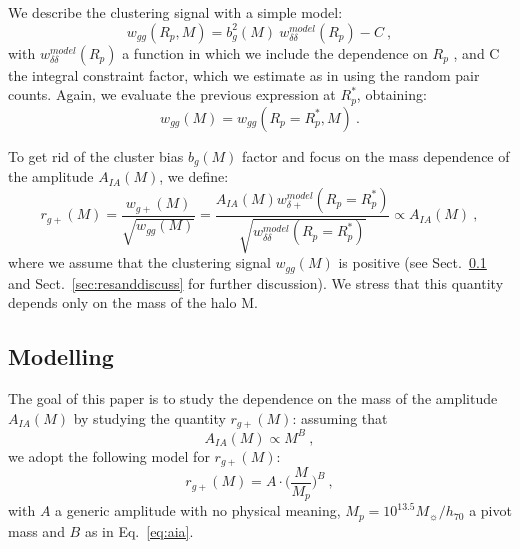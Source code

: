 \documentclass[a4paper,fleqn,usenatbib]{mnras}
\begin{document}
We describe the clustering signal with a simple model:
\begin{equation}
    w_{gg} (R_p, M)=b_g^2 (M)\ w_{\delta \delta}^{model} (R_p) - C \ , 
	\label{eq:wgg}
\end{equation}
with $w_{\delta \delta}^{model} (R_p)$ a function in which we include the dependence on $R_p$ \citep[equation 9]{vanUitertJoachimi2017}, and C the integral constraint factor, which we estimate as in \citet[equation 8]{RocheEales1999} using the random pair counts. Again, we evaluate the previous expression at $R_p^*$, obtaining:
\begin{equation}
    w_{gg} (M)= w_{gg} (R_p = R_p^*, M) \ .
	\label{eq:wgpmass}
\end{equation}

To get rid of the cluster bias $b_g (M)$ factor and focus on the mass dependence of the amplitude $A_{IA} (M)$, we define:
\begin{equation}
    r_{g+} (M)=\frac{w_{g+} (M)}{\sqrt{w_{gg} (M)}} =\frac{A_{IA} (M) w_{\delta +}^{model} (R_p = R_p^*) }{\sqrt{w_{\delta \delta}^{model} (R_p=R_p^*)}} \propto A_{IA} (M) \ ,
	\label{eq:rg+}
\end{equation}
where we assume that the clustering signal $w_{gg}(M)$ is positive (see Sect.~\ref{subsec:modelling} and Sect.~\ref{sec:resanddiscuss} for further discussion). We stress that this quantity depends only on the mass of the halo M.

\subsection{Modelling}
\label{subsec:modelling}
The goal of this paper is to study the dependence on the mass of the amplitude $A_{IA} (M)$ by studying the quantity $r_{g+} (M)$: assuming that
\begin{equation}
A_{IA} (M)\propto M^{B} \ , 
	\label{eq:aia}
\end{equation}
we adopt the following model for $r_{g+} (M)$:
\begin{equation}
    r_{g+} (M) = A \cdot  \biggl ( \frac{M}{M_p} \biggl )^{B} \ ,
	\label{eq:modelrg+}
\end{equation}
with $A$ a generic amplitude with no physical meaning, $M_p = 10^{13.5} M_{\sun}/h_{70}$ a pivot mass and $B$ as in Eq.~\ref{eq:aia}.
\end{document}
